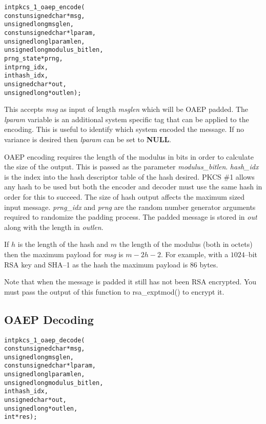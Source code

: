 \documentclass[synpaper]{book}
\begin{document}
\begin{alltt}
int pkcs_1_oaep_encode(
    const unsigned char *msg,
          unsigned long  msglen,
    const unsigned char *lparam,
          unsigned long  lparamlen,
          unsigned long  modulus_bitlen,
             prng_state *prng,
                    int  prng_idx,
                    int  hash_idx,
          unsigned char *out,
          unsigned long *outlen);
\end{alltt}

This accepts \textit{msg} as input of length \textit{msglen} which will be OAEP padded.  The \textit{lparam} variable is an additional system specific
tag that can be applied to the encoding.  This is useful to identify which system encoded the message.  If no variance is desired then
\textit{lparam} can be set to \textbf{NULL}.

OAEP encoding requires the length of the modulus in bits in order to calculate the size of the output.  This is passed as the parameter
\textit{modulus\_bitlen}.  \textit{hash\_idx} is the index into the hash descriptor table of the hash desired.  PKCS \#1 allows any hash to be
used but both the encoder and decoder must use the same hash in order for this to succeed.  The size of hash output affects the maximum
 sized input message.  \textit{prng\_idx} and \textit{prng} are the random number generator arguments required to randomize the padding process.
The padded message is stored in \textit{out} along with the length in \textit{outlen}.

If $h$ is the length of the hash and $m$ the length of the modulus (both in octets) then the maximum payload for \textit{msg} is
$m - 2h - 2$.  For example, with a $1024$--bit RSA key and SHA--1 as the hash the maximum payload is $86$ bytes.

Note that when the message is padded it still has not been RSA encrypted.  You must pass the output of this function to
rsa\_exptmod() to encrypt it.

\subsection{OAEP Decoding}

\begin{alltt}
int pkcs_1_oaep_decode(
    const unsigned char *msg,
          unsigned long  msglen,
    const unsigned char *lparam,
          unsigned long  lparamlen,
          unsigned long  modulus_bitlen,
                    int  hash_idx,
          unsigned char *out,
          unsigned long *outlen,
                    int *res);
\end{alltt}
\end{document}
